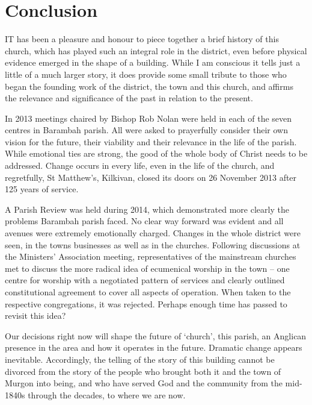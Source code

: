\chapter{Conclusion}
\nobalance


\lettrine[lines=3]{I}{T}
 has been a pleasure and honour to piece together a brief history of this church, which has played such an integral role in the district, even before physical evidence emerged in the shape of a building. While I am conscious it tells just a little of a much larger story, it does provide some small tribute to those who began the founding work of the district, the town and this church, and affirms the relevance and significance of the past in relation to the present.

In 2013 meetings chaired by Bishop Rob Nolan were held in each of the seven centres in Barambah parish. All were asked to prayerfully consider their own vision for the future, their viability and their relevance in the life of the parish. While emotional ties are strong, the good of the whole body of Christ needs to be addressed. Change occurs in every life, even in the life of the church, and regretfully, St Matthew's, Kilkivan, closed its doors on 26 November 2013 after 125 years of service.



\balance


A Parish Review was held during 2014, which demonstrated more clearly the problems Barambah parish faced. No clear way forward was evident and all avenues were extremely emotionally charged. Changes in the whole district were seen, in the towns businesses as well as in the churches. Following discussions at the Ministers' Association meeting, representatives of the mainstream churches met to discuss the more radical idea of ecumenical worship in the town -- one centre for worship with a negotiated pattern of services and clearly outlined constitutional agreement to cover all aspects of operation. When taken to the respective congregations, it was rejected. Perhaps enough time has passed to revisit this idea?



Our decisions right now will shape the future of `church', this parish, an Anglican presence in the area and how it operates in the future. Dramatic change appears inevitable. Accordingly, the telling of the story of this building cannot be divorced from the story of the people who brought both it and the town of Murgon into being, and who have served God and the community from the mid-1840s through the decades, to where we are now.



